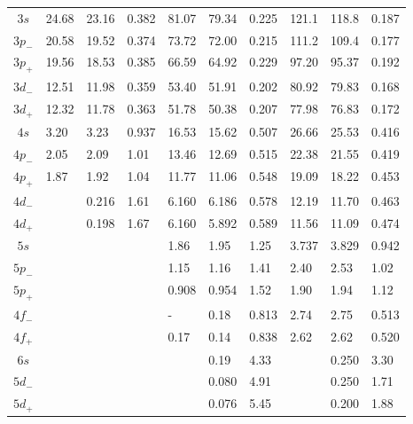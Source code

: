 \begin{tabularx}{\textwidth}{|c|YYY|YYY|YYY|}
$3s$   & 24.68  & 23.16  & 0.382  & 81.07  & 79.34  & 0.225  & 121.1  & 118.8  & 0.187 \\
$3p_-$ & 20.58  & 19.52  & 0.374  & 73.72  & 72.00  & 0.215  & 111.2  & 109.4  & 0.177 \\
$3p_+$ & 19.56  & 18.53  & 0.385  & 66.59  & 64.92  & 0.229  & 97.20  & 95.37  & 0.192 \\
$3d_-$ & 12.51  & 11.98  & 0.359  & 53.40  & 51.91  & 0.202  & 80.92  & 79.83  & 0.168 \\
$3d_+$ & 12.32  & 11.78  & 0.363  & 51.78  & 50.38  & 0.207  & 77.98  & 76.83  & 0.172 \\
$4s$   & 3.20   & 3.23   & 0.937  & 16.53  & 15.62  & 0.507  & 26.66  & 25.53  & 0.416 \\
$4p_-$ & 2.05   & 2.09   & 1.01   & 13.46  & 12.69  & 0.515  & 22.38  & 21.55  & 0.419 \\
$4p_+$ & 1.87   & 1.92   & 1.04   & 11.77  & 11.06  & 0.548  & 19.09  & 18.22  & 0.453 \\
$4d_-$ &        & 0.216  & 1.61   & 6.160  & 6.186  & 0.578  & 12.19  & 11.70  & 0.463 \\
$4d_+$ &        & 0.198  & 1.67   & 6.160  & 5.892  & 0.589  & 11.56  & 11.09  & 0.474 \\
$5s$   &        &        &        & 1.86   & 1.95   & 1.25   & 3.737  & 3.829  & 0.942 \\
$5p_-$ &        &        &        & 1.15   & 1.16   & 1.41   & 2.40   & 2.53   & 1.02 \\
$5p_+$ &        &        &        & 0.908  & 0.954  & 1.52   & 1.90   & 1.94   & 1.12 \\
$4f_-$ &        &        &        & -      & 0.18   & 0.813  & 2.74   & 2.75   & 0.513 \\
$4f_+$ &        &        &        & 0.17   & 0.14   & 0.838  & 2.62   & 2.62   & 0.520 \\
$6s$   &        &        &        &        & 0.19   & 4.33   &        & 0.250  & 3.30 \\
$5d_-$ &        &        &        &        & 0.080  & 4.91   &        & 0.250  & 1.71 \\
$5d_+$ &        &        &        &        & 0.076  & 5.45   &        & 0.200  & 1.88 \\
\end{tabularx}

